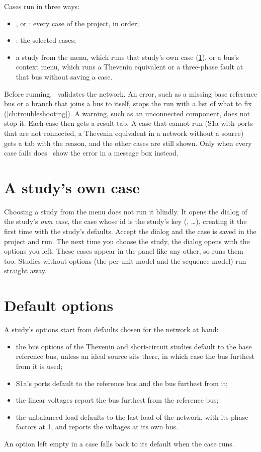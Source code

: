 Cases run in three ways:

\begin{itemize}
  \item {},  or : every case of
    the project, in order;
  \item {}: the selected cases;
  \item a study from the  menu, which runs that study's own case
    (\cref{sec:own-case}), or a bus's context menu, which runs a Thevenin equivalent or a
    three-phase fault at that bus without saving a case.
\end{itemize}

Before running, \app\ validates the network. An error, such as a missing base reference
bus or a branch that joins a bus to itself, stops the run with a list of what to fix
(\cref{ch:troubleshooting}). A warning, such as an unconnected component, does not stop
it. Each case then gets a result tab. A case that cannot run (S1a with ports that are not
connected, a Thevenin equivalent in a network without a source) gets a tab with the
reason, and the other cases are still shown. Only when every case fails does \app\ show
the error in a message box instead.

\section{A study's own case}\label{sec:own-case}

Choosing a study from the  menu does not run it blindly. It opens the
dialog of the study's \emph{own case}, the case whose id is the study's key (,
\dots), creating it the first time with the study's defaults. Accept the
dialog and the case is saved in the project and run. The next time you choose the study,
the dialog opens with the options you left. These cases appear in the 
panel like any other, so  runs them too. Studies without options (the per-unit
model and the sequence model) run straight away.

\section{Default options}

A study's options start from defaults chosen for the network at hand:

\begin{itemize}
  \item the bus options of the Thevenin and short-circuit studies default to the base
    reference bus, unless an ideal source sits there, in which case the bus furthest from
    it is used;
  \item S1a's ports default to the reference bus and the bus furthest from it;
  \item the linear voltages report the bus furthest from the reference bus;
  \item the unbalanced load defaults to the last load of the network, with its phase
    factors at 1, and reports the voltages at its own bus.
\end{itemize}

An option left empty in a case falls back to its default when the case runs.
